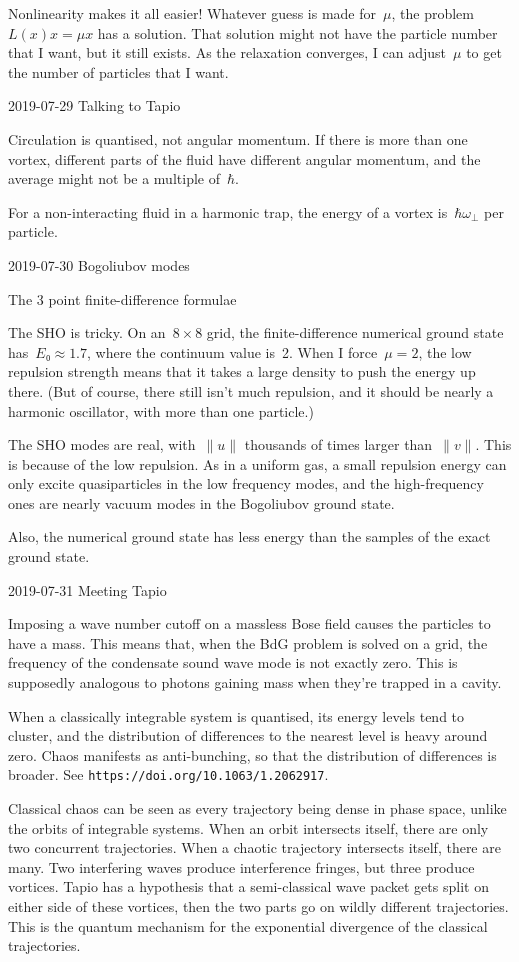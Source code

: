 Nonlinearity makes it all easier!  Whatever guess is made for~$μ$, the problem~$L(x)x=μx$ has a solution.  That solution might not have the particle number that I want, but it still exists.  As the relaxation converges, I can adjust~$μ$ to get the number of particles that I want.

2019-07-29 Talking to Tapio

Circulation is quantised, not angular momentum.  If there is more than one vortex, different parts of the fluid have different angular momentum, and the average might not be a multiple of~$ℏ$.

For a non-interacting fluid in a harmonic trap, the energy of a vortex is~$ℏω_\perp$ per particle.

2019-07-30 Bogoliubov modes

The 3 point finite-difference formulae 

The SHO is tricky.  On an~$8×8$ grid, the finite-difference numerical ground state has~$E₀≈1.7$, where the continuum value is~2.  When I force~$μ=2$, the low repulsion strength means that it takes a large density to push the energy up there.  (But of course, there still isn't much repulsion, and it should be nearly a harmonic oscillator, with more than one particle.)

The SHO modes are real, with~$∥u∥$ thousands of times larger than~$∥v∥$.  This is because of the low repulsion.  As in a uniform gas, a small repulsion energy can only excite quasiparticles in the low frequency modes, and the high-frequency ones are nearly vacuum modes in the Bogoliubov ground state. 

Also, the numerical ground state has less energy than the samples of the exact ground state.

2019-07-31 Meeting Tapio

Imposing a wave number cutoff on a massless Bose field causes the particles to have a mass.  This means that, when the BdG problem is solved on a grid, the frequency of the condensate sound wave mode is not exactly zero.  This is supposedly analogous to photons gaining mass when they're trapped in a cavity.

When a classically integrable system is quantised, its energy levels tend to cluster, and the distribution of differences to the nearest level is heavy around zero.  Chaos manifests as anti-bunching, so that the distribution of differences is broader.  See {\tt https://doi.org/10.1063/1.2062917}.

Classical chaos can be seen as every trajectory being dense in phase space, unlike the orbits of integrable systems.  When an orbit intersects itself, there are only two concurrent trajectories.  When a chaotic trajectory intersects itself, there are many.  Two interfering waves produce interference fringes, but three produce vortices.  Tapio has a hypothesis that a semi-classical wave packet gets split on either side of these vortices, then the two parts go on wildly different trajectories.  This is the quantum mechanism for the exponential divergence of the classical trajectories.

